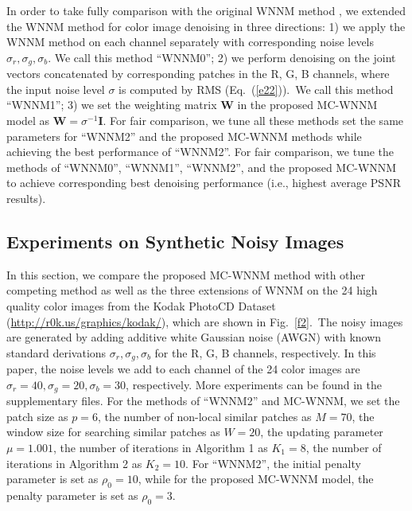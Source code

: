 \documentclass[10pt,twocolumn,letterpaper,sort&compress]{article}
\begin{document}
In order to take fully comparison with the original WNNM method \cite{wnnmijcv}, we extended the WNNM method \cite{wnnmijcv} for color image denoising in three directions: 1) we apply the WNNM method \cite{wnnmijcv} on each channel separately with corresponding noise levels $\sigma_{r}, \sigma_{g}, \sigma_{b}$. We call this method ``WNNM0''; 2) we perform denoising on the joint vectors concatenated by corresponding patches in the R, G, B channels, where the input noise level $\sigma$ is computed by RMS (Eq.\ (\ref{e22})).\ We call this method ``WNNM1''; 3) we set the weighting matrix $\mathbf{W}$ in the proposed MC-WNNM model as $\mathbf{W}=\sigma^{-1}\mathbf{I}$. For fair comparison, we tune all these methods set the same parameters for ``WNNM2'' and the proposed MC-WNNM methods while achieving the best performance of ``WNNM2''. For fair comparison, we tune the methods of ``WNNM0'', ``WNNM1'', ``WNNM2'', and the proposed MC-WNNM to achieve corresponding best denoising performance (i.e., highest average PSNR results). 

\subsection{Experiments on Synthetic Noisy Images}
In this section, we compare the proposed MC-WNNM method with other competing method \cite{cbm3d,mlp,chen2015learning,noiseclinic,neatimage} as well as the three extensions of WNNM \cite{wnnmijcv} on the 24 high quality color images from the Kodak PhotoCD Dataset (\url{http://r0k.us/graphics/kodak/}), which are shown in Fig.\ \ref{f2}.\ The noisy images are generated by adding additive white Gaussian noise (AWGN) with known standard derivations $\sigma_{r}, \sigma_{g}, \sigma_{b}$ for the R, G, B channels, respectively. In this paper, the noise levels we add to each channel of the 24 color images are $\sigma_{r}=40, \sigma_{g}=20, \sigma_{b}=30$, respectively. More experiments can be found in the supplementary files. For the methods of ``WNNM2'' and MC-WNNM, we set the patch size as $p = 6$, the number of non-local similar patches as $M = 70$, the window size for searching similar patches as $W = 20$, the updating parameter $\mu=1.001$, the number of iterations in Algorithm 1 as $K_{1} = 8$, the number of iterations in Algorithm 2 as $K_{2}=10$. For ``WNNM2'', the initial penalty parameter is set as $\rho_{0}=10$, while for the proposed MC-WNNM model, the penalty parameter is set as $\rho_{0}=3$.
\end{document}
